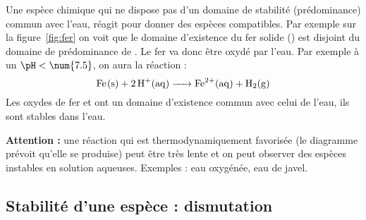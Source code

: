 \documentclass{cours}
\begin{document}
Une espèce chimique qui ne dispose pas d'un domaine de stabilité (prédominance) commun avec l'eau, réagit pour donner des espèces compatibles. Par exemple sur la figure~\ref{fig:fer} on voit que le domaine d'existence du fer solide () est disjoint du domaine de prédominance de . Le fer va donc être oxydé par l'eau. Par exemple à un $\pH< \num{7.5}$, on aura la réaction :
\begin{equation}
  \ce{Fe(s) + 2H+(aq) -> Fe^2+(aq) + H2(g)}
\end{equation}
Les oxydes de fer  et  ont un domaine d'existence commun avec celui de l'eau, ils sont stables dans l'eau.

\textbf{Attention :} une réaction qui est thermodynamiquement favorisée (le diagramme prévoit qu'elle se produise) peut être très lente et on peut observer des espèces instables en solution aqueuses. Exemples : eau oxygénée, eau de javel.

\subsection{Stabilité d'une espèce : dismutation}%
\label{sub:stabilite_d_une_espece_dismutation}
\end{document}
